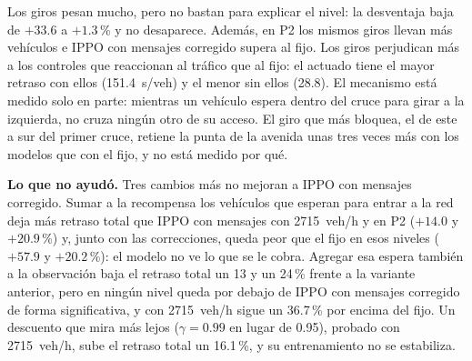 Los giros pesan mucho, pero no bastan para explicar el nivel: la
desventaja baja de $+33.6$ a $+1.3$\,\% y no desaparece. Además, en P2
los mismos giros llevan más vehículos e IPPO con mensajes corregido
supera al fijo. Los giros perjudican más a los controles que reaccionan
al tráfico que al fijo: el actuado tiene el mayor retraso con ellos
(151.4~s/veh) y el menor sin ellos (28.8). El mecanismo está medido
solo en parte: mientras un vehículo espera dentro del cruce para
girar a la izquierda, no cruza ningún otro de su acceso. El giro que más
bloquea, el de este a sur del primer cruce, retiene la punta de la
avenida unas tres veces más con los modelos que con el fijo, y no está
medido por qué.

\textbf{Lo que no ayudó.} Tres cambios más no mejoran a IPPO con
mensajes corregido. Sumar a la recompensa los vehículos que esperan para entrar
a la red deja más retraso total que IPPO con mensajes con 2715~veh/h y
en P2 ($+14.0$ y $+20.9$\,\%) y, junto con las correcciones, queda peor
que el fijo en esos niveles ($+57.9$ y $+20.2$\,\%): el modelo no ve lo
que se le cobra. Agregar esa espera también a la observación baja el
retraso total un 13 y un 24\,\% frente a la variante anterior, pero en
ningún nivel queda por debajo de IPPO con mensajes corregido de forma
significativa, y con 2715~veh/h sigue un 36.7\,\% por encima del fijo.
Un descuento que mira más lejos ($\gamma = 0.99$ en lugar de 0.95),
probado con 2715~veh/h, sube el retraso total un 16.1\,\%, y su
entrenamiento no se estabiliza.

